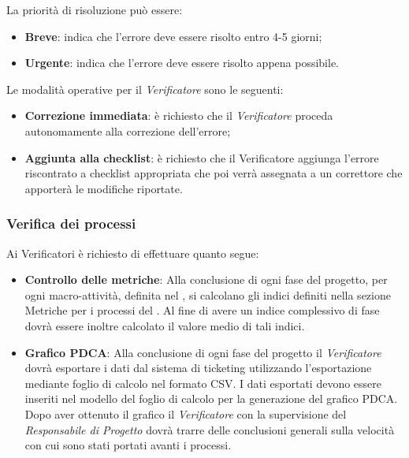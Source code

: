 {La priorità di risoluzione può essere:
\begin{itemize}
\item \textbf{Breve}: indica che l’errore deve essere risolto entro 4-5 giorni;
\item \textbf{Urgente}: indica che l’errore deve essere risolto appena possibile.
\end{itemize}
Le modalità operative per il \emph{Verificatore} sono le seguenti:
\begin{itemize}
\item \textbf{Correzione immediata}: è richiesto che il \emph{Verificatore} proceda autonomamente alla correzione dell’errore;
\item \textbf{Aggiunta alla checklist}: è richiesto che il Verificatore aggiunga l’errore riscontrato a checklist appropriata che poi verrà assegnata a un correttore che apporterà le modifiche riportate.
\end{itemize}
\subsubsection{Verifica dei processi}
Ai Verificatori è richiesto di effettuare quanto segue:
\begin{itemize}
\item \textbf{Controllo delle metriche}: Alla conclusione di ogni fase del progetto, per ogni
macro-attività, definita nel \href{run:../../Esterni/\fPianoDiProgetto}{\fEscapePianoDiProgetto} , si calcolano gli indici definiti
nella sezione Metriche per i processi del \href{run:../../Esterni/\fPianoDiQualifica}{\fEscapePianoDiQualifica} . Al fine di avere
un indice complessivo di fase dovrà essere inoltre calcolato il valore medio di tali indici.

\item \textbf{Grafico PDCA}: Alla conclusione di ogni fase del progetto il \emph{Verificatore} dovrà esportare i dati dal sistema di ticketing utilizzando l’esportazione mediante foglio
di calcolo nel formato CSV. I dati esportati devono essere inseriti nel modello del foglio di calcolo per la generazione del grafico PDCA.\\
Dopo aver ottenuto il grafico il \emph{Verificatore} con la supervisione del \emph{Responsabile di Progetto} dovrà trarre delle conclusioni generali sulla velocità con cui sono stati portati avanti i processi.
\end{itemize}

}
